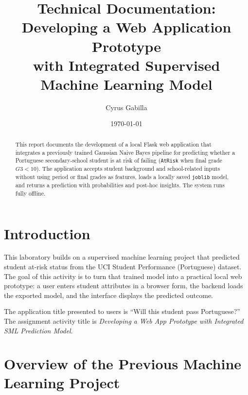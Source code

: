 \documentclass[11pt,a4paper]{article}
\title{Technical Documentation:\\Developing a Web Application Prototype\\with Integrated Supervised Machine Learning Model}
\author{Cyrus Gabilla}
\date{\today}
\begin{document}
\maketitle

\begin{abstract}
This report documents the development of a local Flask web application that integrates a previously trained Gaussian Naive Bayes pipeline for predicting whether a Portuguese secondary-school student is at risk of failing (\texttt{AtRisk} when final grade \(G3 < 10\)). The application accepts student background and school-related inputs without using period or final grades as features, loads a locally saved \texttt{joblib} model, and returns a prediction with probabilities and post-hoc insights. The system runs fully offline.
\end{abstract}

\tableofcontents
\newpage

\section{Introduction}

This laboratory builds on a supervised machine learning project that predicted student at-risk status from the UCI Student Performance (Portuguese) dataset. The goal of this activity is to turn that trained model into a practical local web prototype: a user enters student attributes in a browser form, the backend loads the exported model, and the interface displays the predicted outcome.

The application title presented to users is ``Will this student pass Portuguese?'' The assignment activity title is \emph{Developing a Web App Prototype with Integrated SML Prediction Model}.

\section{Overview of the Previous Machine Learning Project}
\end{document}
